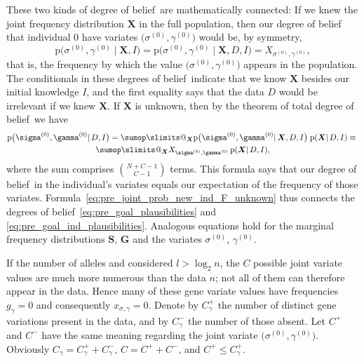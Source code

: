 \documentclass[\ifafour a4paper,12pt,\else a5paper,10pt,\fi%
onecolumn,oneside,article,%
british%
]{memoir}
\makeatletter
\theoremstyle{remark}
\theoremstyle{innote}
\def\sum{\DOTSI\sumop\slimits@}
\renewcommand{\le}{\leqslant}%
\newcommand*{\pf}{\mathrm{p}}%
\renewcommand*{\|}{\mathpunct{|}}
\newcommand*{\dob}{degree of belief}
\newcommand*{\dobs}{degrees of belief}
\newcommand*{\yD}{D}
\newcommand*{\yI}{I}
\newcommand*{\ys}{\sigma}
\newcommand*{\yg}{\gamma}
\newcommand*{\gn}{l}
\newcommand*{\ysi}[1]{\ys^{(#1)}}
\newcommand*{\ygi}[1]{\yg^{(#1)}}
\newcommand*{\yso}{\ysi{0}}
\newcommand*{\ygo}{\ygi{0}}
\newcommand*{\yFs}{\bm{S}}
\newcommand*{\yFg}{\bm{G}}
\newcommand*{\yF}{\bm{X}}
\newcommand*{\yCg}{C_{\gamma}}
\newcommand*{\yCgd}{\yCg^{+}}
\newcommand*{\yCgn}{\yCg^{-}}
\newcommand*{\yCd}{C^{+}}
\newcommand*{\yCn}{C^{-}}
\makeatother
\begin{document}
These two kinds of \dob\ are mathematically connected: If we knew the joint
frequency distribution $\yF$ in the full population, then our degree of
belief that individual $0$ have variates $\bigl( \yso,\ygo \bigr)$ would
be, by symmetry,
\begin{equation}
  \label{eq:pre_joint_prob_new_ind_F_known}
  \pf\bigl(\yso, \ygo \| \yF, \yI\bigr)  =
  \pf\bigl(\yso, \ygo \| \yF, \yD, \yI\bigr)  =
  X_{\yso, \ygo},
\end{equation}
that is, the frequency by which the value $\bigl(\yso, \ygo\bigr)$ appears
in the population. The conditionals in these \dobs\ indicate that we know
$\yF$ besides our initial knowledge $\yI$, and the first equality says that
the data $\yD$ would be irrelevant if we knew $\yF$. If $\yF$ is unknown,
then by the theorem of total \dob\ we have
\begin{multline}
  \label{eq:pre_joint_prob_new_ind_F_unknown}
  \pf\bigl(\yso, \ygo \| \yD, \yI\bigr)  =
  \sum_{\yF}  \pf\bigl(\yso, \ygo \| \yF, \yD, \yI\bigr) \;
  \pf( \yF \| \yD, \yI) \equiv{}\\
  \sum_{\yF}  X_{\yso, \ygo}\,  \pf( \yF \| \yD, \yI),
\end{multline}
where the sum comprises $\binom{N+C-1}{C-1}$ terms. This formula says that
our \dob\ in the individual's variates equals our expectation of the
frequency of those variates.
Formula~\eqref{eq:pre_joint_prob_new_ind_F_unknown} thus connects the degrees
of belief~\eqref{eq:pre_goal_plausibilities} and
\eqref{eq:pre_goal_ind_plausibilities}. Analogous equations hold for the
marginal frequency distributions $\yFs$, $\yFg$ and the variates $\yso$,
$\ygo$.


If the number of alleles and considered $\gn>\log_{2}n$, the $C$ possible
joint variate values are much more numerous than the data $n$; not all of
them can therefore appear in the data. Hence many of these gene variate
values have frequencies $g_{\yg}=0$ and consequently $x_{\ys,\yg}=0$.
Denote by $\yCgd$ the number of distinct gene variations present in the
data, and by $\yCgn$ the number of those absent. Let $\yCd$ and $\yCn$ have
the same meaning regarding the joint variate
$\bigl( \ysi{0}, \ygi{0} \bigr)$. Obviously $\yCg = \yCgd+\yCgn$,
$C=\yCd+\yCn$, and $\yCd \le \yCgd$.
\end{document}
